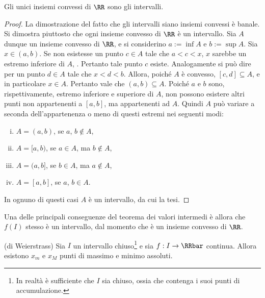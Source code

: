 \documentclass[11pt]{article}
\begin{document}
	\begin{proposition}
		Gli unici insiemi convessi di $\RR$ sono gli intervalli.
	\end{proposition}

	\begin{proof}
		La dimostrazione del fatto che gli intervalli siano insiemi convessi è banale. Si dimostra piuttosto
		che ogni insieme convesso di $\RR$ è un intervallo. Sia $A$ dunque un insieme convesso di $\RR$,
		e si considerino $a := \inf A$ e $b := \sup A$. Sia $x \in (a, b)$. Se non esistesse un punto $c \in A$
		tale che $a < c < x$, $x$ sarebbe un estremo inferiore di $A$, \Lightning. Pertanto tale punto $c$ esiste.
		Analogamente si può dire per un punto $d \in A$ tale che $x < d < b$. Allora, poiché $A$ è convesso,
		$[c, d] \subseteq A$, e in particolare $x \in A$. Pertanto vale che $(a, b) \subseteq A$. Poiché
		$a$ e $b$ sono, rispettivamente, estremo inferiore e superiore di $A$, non possono esistere altri punti
		non appartenenti a $[a, b]$, ma appartenenti ad $A$. Quindi $A$ può variare a seconda dell'appartenenza
		o meno di questi estremi nei seguenti modi:
		
		\begin{enumerate}[(i)]
			\item $A = (a, b)$, se $a$, $b \notin A$,
			\item $A = [a, b)$, se $a \in A$, ma $b \notin A$,
			\item $A = (a, b]$, se $b \in A$, ma $a \notin A$,
			\item $A = [a, b]$, se $a$, $b \in A$.
		\end{enumerate}
	
		In ognuno di questi casi $A$ è un intervallo, da cui la tesi.
	\end{proof}

	\begin{remark}
		Una delle principali conseguenze del teorema dei valori intermedi è allora che $f(I)$ stesso è un intervallo,
		dal momento che è un insieme convesso di $\RR$.
	\end{remark}

	\begin{theorem} (di Weierstrass) Sia $I$ un intervallo chiuso\footnote{In realtà è sufficiente che $I$ sia chiuso, ossia che contenga i suoi punti
	di accumulazione.} e sia
		$f : I \to \RRbar$ continua. Allora esistono $x_m$ e $x_M$ punti
		di massimo e minimo assoluti.
	\end{theorem}
\end{document}
